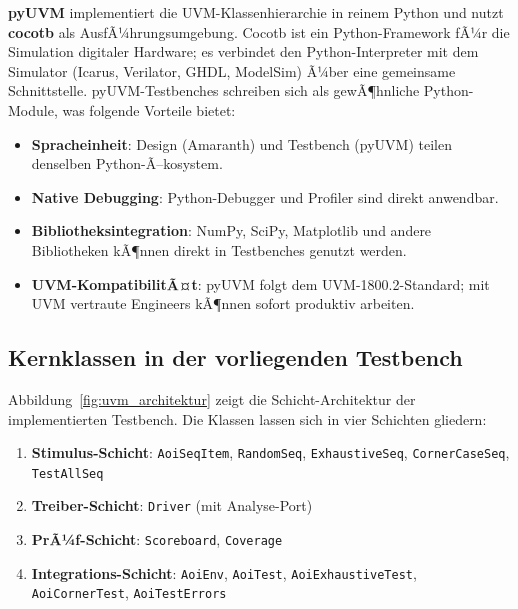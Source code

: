 ﻿\documentclass[12pt,a4paper]{report}
\begin{document}
\textbf{pyUVM} \cite{pyuvm2024} implementiert die UVM-Klassen\-hierarchie in
reinem Python und nutzt \textbf{cocotb} als AusfÃ¼hrungs\-umgebung. Cocotb ist ein
Python-Framework fÃ¼r die Simulation digitaler Hardware; es verbindet den
Python-Interpreter mit dem Simulator (Icarus, Verilator, GHDL, ModelSim) Ã¼ber
eine gemeinsame Schnittstelle. pyUVM-Testbenches schreiben sich als
gewÃ¶hnliche Python-Module, was folgende Vorteile bietet:

\begin{itemize}
    \item \textbf{Spracheinheit}: Design (Amaranth) und Testbench (pyUVM) teilen denselben Python-Ã–kosystem.
    \item \textbf{Native Debugging}: Python-Debugger und Profiler sind direkt anwendbar.
    \item \textbf{Bibliotheksintegration}: NumPy, SciPy, Matplotlib und andere
          Bibliotheken kÃ¶nnen direkt in Testbenches genutzt werden.
    \item \textbf{UVM-KompatibilitÃ¤t}: pyUVM folgt dem UVM-1800.2-Standard; mit UVM
          vertraute Engineers kÃ¶nnen sofort produktiv arbeiten.
\end{itemize}

\subsection{Kernklassen in der vorliegenden Testbench}

Abbildung~\ref{fig:uvm_architektur} zeigt die Schicht-Architektur der
implementierten Testbench. Die Klassen lassen sich in vier Schichten gliedern:

\begin{enumerate}
    \item \textbf{Stimulus-Schicht}: \texttt{AoiSeqItem}, \texttt{RandomSeq},
          \texttt{ExhaustiveSeq}, \texttt{CornerCaseSeq}, \texttt{Test\newline AllSeq}
    \item \textbf{Treiber-Schicht}: \texttt{Driver} (mit Analyse-Port)
    \item \textbf{PrÃ¼f-Schicht}: \texttt{Scoreboard}, \texttt{Coverage}
    \item \textbf{Integrations-Schicht}: \texttt{AoiEnv}, \texttt{AoiTest},
          \texttt{AoiExhaustiveTest}, \texttt{AoiCornerTest}, \texttt{AoiTestErrors}
\end{enumerate}
\end{document}
